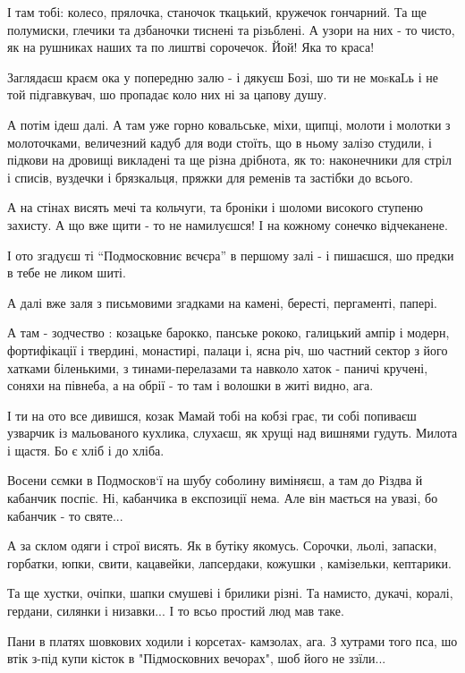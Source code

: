 І там тобі: колесо, прялочка, станочок ткацький, кружечок гончарний. Та ще
полумиски, глечики та дзбаночки тиснені та різьблені. А узори на них - то
чисто, як на рушниках наших та по лиштві сорочечок. Йой! Яка то краса!

Заглядаєш краєм ока у попередню залю - і дякуєш Бозі, шо ти не моsкаLь і не той підгавкувач, шо пропадає коло них ні за цапову душу.

А потім ідеш далі. А там уже горно ковальське, міхи, щипці, молоти і молотки з
молоточками, величезний кадуб для води стоїть, що в ньому залізо студили, і
підкови на дровищі викладені та ще різна дрібнота, як то: наконечники для стріл
і списів, вуздечки і брязкальця, пряжки для ременів та застібки до всього.

А на стінах висять мечі та кольчуги, та броніки і шоломи високого ступеню
захисту. А що вже щити - то не намилуєшся! І на кожному сонечко відчеканене. 

І ото згадуєш ті \enquote{Подмосковниє вєчєра} в першому залі - і пишаєшся, шо предки в тебе не ликом шиті.

А далі вже заля з письмовими згадками на камені, бересті, пергаменті, папері. 

А там - зодчество : козацьке барокко, панське рококо, галицький ампір і модерн,
фортифікації і твердині, монастирі, палаци і, ясна річ, шо частний сектор з
його хатками біленькими, з тинами-перелазами та навколо хаток - паничі кручені,
соняхи на півнеба, а на обрії - то там і волошки в житі видно, ага.

І ти на ото все дивишся, козак Мамай тобі на кобзі грає, ти собі попиваєш
узварчик із мальованого кухлика, слухаєш, як хрущі над вишнями гудуть. Милота і
щастя. Бо є хліб і до хліба.

Восени сємки в Подмосков`ї на шубу соболину виміняєш, а там до Різдва й
кабанчик поспіє. Ні, кабанчика в експозиції нема. Але він мається на увазі, бо
кабанчик - то святе...

А за склом одяги і строї висять. Як в бутіку якомусь. Сорочки, льолі, запаски,
горбатки, юпки, свити, кацавейки, лапсердаки, кожушки , камізельки, кептарики.

Та ще хустки, очіпки, шапки смушеві і брилики різні. Та намисто, дукачі,
коралі, гердани, силянки і низавки...  І то всьо простий люд мав таке. 

Пани в платях шовкових ходили і корсетах- камзолах, ага. З хутрами того пса, шо
втік з-під купи кісток в "Підмосковних вечорах", шоб його не ззїли...

